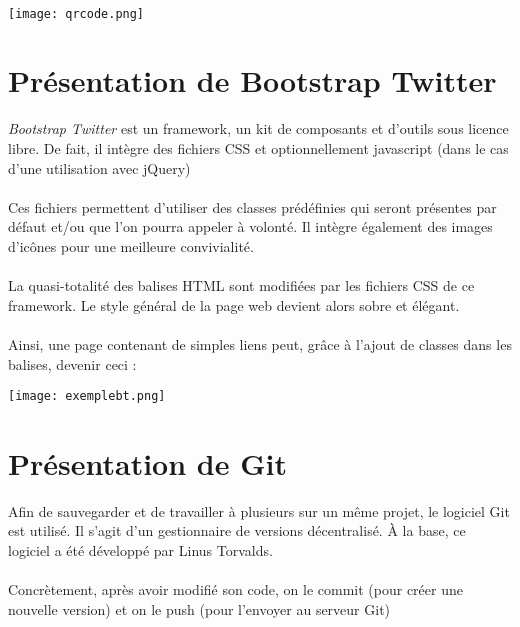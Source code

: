 \documentclass[a4paper,12pt,titlepage]{report}
\begin{document}
\paragraph*{}
\texttt{[image: qrcode.png]}

\newpage

\section{Présentation de Bootstrap Twitter}

\emph{Bootstrap Twitter} est un framework, un kit de composants et d'outils sous licence libre. De fait, il intègre des fichiers CSS et optionnellement javascript (dans le cas d'une utilisation avec jQuery)
\paragraph*{}
Ces fichiers permettent d'utiliser des classes prédéfinies qui seront présentes par défaut et/ou que l'on pourra appeler à volonté. Il intègre également des images d'icônes pour une meilleure convivialité.
\paragraph*{}
La quasi-totalité des balises HTML sont modifiées par les fichiers CSS de ce framework. Le style général de la page web devient alors sobre et élégant.
\paragraph*{}
Ainsi, une page contenant de simples liens peut, grâce à l'ajout de classes dans les balises, devenir ceci :

\texttt{[image: exemplebt.png]}

\newpage

\section{Présentation de Git}

Afin de sauvegarder et de travailler à plusieurs sur un même projet, le logiciel Git est utilisé. Il s'agit d'un gestionnaire de versions décentralisé. À la base, ce logiciel a été développé par Linus Torvalds.
\paragraph*{}
Concrètement, après avoir modifié son code, on le \og commit \fg{}  (pour créer une nouvelle version) et on le \og push \fg{} (pour l'envoyer au serveur Git)
\end{document}
